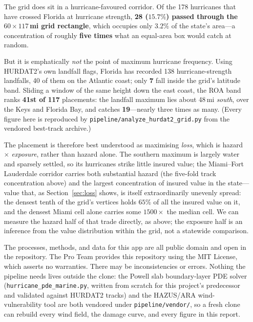 \documentclass[11pt]{article}
\begin{document}
The grid does sit in a hurricane-favoured corridor. Of the 178 hurricanes that have
crossed Florida at hurricane strength, \textbf{28 ($15.7\%$) passed through the
$60\times117$\,mi grid rectangle}, which occupies only $3.2\%$ of the state's area---a
concentration of roughly \textbf{five times} what an equal-area box would catch at
random.

But it is emphatically \emph{not} the point of maximum hurricane frequency. Using
HURDAT2's own landfall flags, Florida has recorded 138 hurricane-strength landfalls,
40 of them on the Atlantic coast; only \textbf{7} fall inside the grid's latitude band.
Sliding a window of the same height down the east coast, the ROA band ranks
\textbf{41st of 117} placements: the landfall maximum lies about 48\,mi \emph{south},
over the Keys and Florida Bay, and catches \textbf{19}---nearly three times as many.
(Every figure here is reproduced by \texttt{pipeline/analyze\_hurdat2\_grid.py} from
the vendored best-track archive.)

The placement is therefore best understood as maximising \emph{loss}, which is hazard
$\times$ \emph{exposure}, rather than hazard alone. The southern maximum is largely
water and sparsely settled, so its hurricanes strike little insured value; the
Miami--Fort Lauderdale corridor carries both substantial hazard (the five-fold
track concentration above) and the largest concentration of insured value in the
state---value that, as Section~\ref{sec:loss} shows, is itself extraordinarily
unevenly spread: the densest tenth of the grid's vertices holds $65\%$ of all the
insured value on it, and the densest Miami cell alone carries some $1500\times$ the
median cell. We can measure the hazard half of that trade directly, as above; the
exposure half is an inference from the value distribution within the grid, not a
statewide comparison.

The processes, methods, and data for this app are all public domain and open in the
repository. The Pro Team provides this repository using the MIT License, which asserts
no warranties. There may be inconsistencies or errors. Nothing the pipeline needs
lives outside the clone: the Powell slab boundary-layer PDE solver
(\texttt{hurricane\_pde\_marine.py}, written from scratch for this project's
predecessor and validated against HURDAT2 tracks) and the HAZUS/ARA wind-vulnerability
tool are both vendored under \texttt{pipeline/vendor/}, so a fresh clone can rebuild
every wind field, the damage curve, and every figure in this report.
\end{document}
